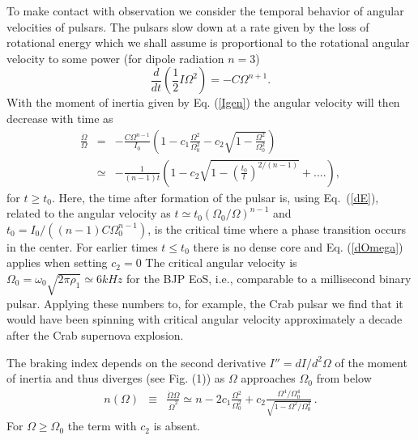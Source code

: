 \begin{multicols}{2}
To make contact with observation we consider the temporal behavior
of angular velocities of pulsars. The pulsars slow down at a rate
given by the loss of rotational energy which we shall assume is
proportional to the rotational angular velocity to some power
(for dipole radiation $n=3$)
\begin{equation}
  \frac{d}{dt} \left(\frac{1}{2}I\Omega^2\right) = 
                  -C \Omega^{n+1}. 
   \label{dE}
\end{equation}
With the moment of inertia given by Eq. (\ref{Igen})
the angular velocity will then decrease with time as
\begin{eqnarray}
  \frac{\dot{\Omega}}{\Omega} &=& -\frac{C\Omega^{n-1}}{I_0}
  \left( 1-c_1\frac{\Omega^2}{\Omega_0^2}
          -c_2\sqrt{1-\frac{\Omega^2}{\Omega_0^2}} \right) \nonumber\\
  &\simeq& -\frac{1}{(n-1)t}
  \left( 1-c_2 \sqrt{1-(\frac{t_0}{t})^{2/(n-1)}} +....\right), 
  \label{dOmega}
\end{eqnarray}
for $t\ge t_0$. Here,
the time after formation of the pulsar is, using Eq.\  (\ref{dE}),
related to the angular velocity as
$t\simeq t_0(\Omega_0/\Omega)^{n-1}$ and 
$t_0=I_0/((n-1)C\Omega_0^{n-1})$, is the critical time where
a phase transition occurs in the center. For earlier times $t\le t_0$ there
is no dense core and Eq. (\ref{dOmega}) applies when setting $c_2=0$
The critical angular velocity is $\Omega_0=\omega_0\sqrt{2\pi \rho_1}\simeq
6 kHz$ for the BJP EoS, i.e., comparable to a millisecond binary
pulsar. Applying these numbers to, for example, the Crab pulsar we find that
it would have been spinning with critical angular velocity approximately 
a decade after the Crab supernova explosion.

The braking index depends on the second derivative $I''=dI/d^2\Omega$
of the moment of inertia and thus diverges (see Fig. (1))
as $\Omega$ approaches $\Omega_0$ from below
\begin{eqnarray}
     n(\Omega) &\equiv& \frac{\ddot{\Omega}\Omega}{\dot{\Omega}^2} 
    \simeq n - 2c_1\frac{\Omega^2}{\Omega_0^2}
    +c_2\frac{\Omega^4/\Omega_0^4}{\sqrt{1-\Omega^2/\Omega_0^2}} \,.\label{n}
\end{eqnarray}
For $\Omega\ge\Omega_0$ the term with $c_2$ is absent.


\end{multicols}
